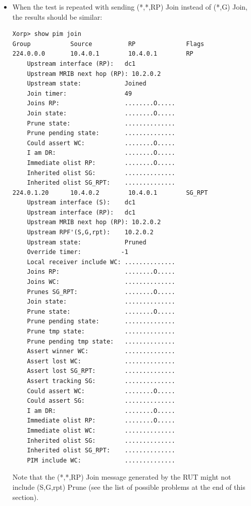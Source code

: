 \documentclass[11pt]{report}
\begin{document}
\begin{itemize}
  \item When the test is repeated with sending (*,*,RP) Join instead of (*,G)
  Join, the results should be similar:

\begin{verbatim}
Xorp> show pim join 
Group           Source          RP              Flags
224.0.0.0       10.4.0.1        10.4.0.1        RP   
    Upstream interface (RP):   dc1
    Upstream MRIB next hop (RP): 10.2.0.2
    Upstream state:            Joined 
    Join timer:                49
    Joins RP:                  ........O.....
    Join state:                ........O.....
    Prune state:               ..............
    Prune pending state:       ..............
    Could assert WC:           ........O.....
    I am DR:                   ........O.....
    Immediate olist RP:        ........O.....
    Inherited olist SG:        ..............
    Inherited olist SG_RPT:    ..............
224.0.1.20      10.4.0.2        10.4.0.1        SG_RPT 
    Upstream interface (S):    dc1
    Upstream interface (RP):   dc1
    Upstream MRIB next hop (RP): 10.2.0.2
    Upstream RPF'(S,G,rpt):    10.2.0.2
    Upstream state:            Pruned 
    Override timer:           -1
    Local receiver include WC: ..............
    Joins RP:                  ........O.....
    Joins WC:                  ..............
    Prunes SG_RPT:             ........O.....
    Join state:                ..............
    Prune state:               ........O.....
    Prune pending state:       ..............
    Prune tmp state:           ..............
    Prune pending tmp state:   ..............
    Assert winner WC:          ..............
    Assert lost WC:            ..............
    Assert lost SG_RPT:        ..............
    Assert tracking SG:        ..............
    Could assert WC:           ........O.....
    Could assert SG:           ..............
    I am DR:                   ........O.....
    Immediate olist RP:        ........O.....
    Immediate olist WC:        ..............
    Inherited olist SG:        ..............
    Inherited olist SG_RPT:    ..............
    PIM include WC:            ..............
\end{verbatim}

  Note that the (*,*,RP) Join message generated by the RUT might not include
  (S,G,rpt) Prune (see the list of possible problems at the end of this
  section).

\end{itemize}
\end{document}
